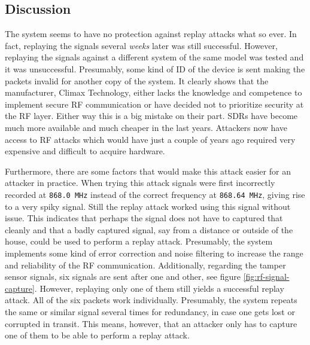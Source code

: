 \subsection{Discussion}
The system seems to have no protection against replay attacks what so ever. In fact, replaying the signals several \textit{weeks} later was still successful. However, replaying the signals against a different system of the same model was tested and it was unsuccessful. Presumably, some kind of ID of the device is sent making the packets invalid for another copy of the system. It clearly shows that the manufacturer, Climax Technology, either lacks the knowledge and competence to implement secure RF communication or have decided not to prioritize security at the RF layer. Either way this is a big mistake on their part. SDRs have become much more available and much cheaper in the last years. Attackers now have access to RF attacks which would have just a couple of years ago required very expensive and difficult to acquire hardware.

Furthermore, there are some factors that would make this attack easier for an attacker in practice. When trying this attack signals were first incorrectly recorded at \texttt{868.0 MHz} instead of the correct frequency at \texttt{868.64 MHz}, giving rise to a very spiky signal. Still the replay attack worked using this signal without issue. This indicates that perhaps the signal does not have to captured that cleanly and that a badly captured signal, say from a distance or outside of the house, could be used to perform a replay attack. Presumably, the system implements some kind of error correction and noise filtering to increase the range and reliability of the RF communication. Additionally, regarding the tamper sensor signals, six signals are sent after one and other, see figure \ref{fig:rf-signal-capture}. However, replaying only one of them still yields a successful replay attack. All of the six packets work individually. Presumably, the system repeats the same or similar signal several times for redundancy, in case one gets lost or corrupted in transit. This means, however, that an attacker only has to capture one of them to be able to perform a replay attack.
